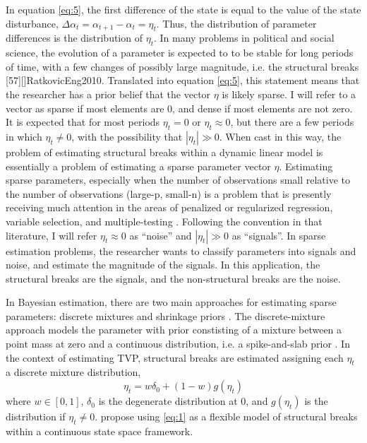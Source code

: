 \documentclass{article}
\begin{document}
In equation \eqref{eq:5}, the first difference of the state is equal to the value of the state disturbance, $\Delta \alpha_{t} = \alpha_{t+1} - \alpha_{t} = \eta_{t}$.
Thus, the distribution of parameter differences is the distribution of $\eta_{t}$.
In many problems in political and social science, the evolution of a parameter is expected to to be stable for long periods of time, with a few changes of possibly large magnitude, i.e. the structural breaks \parencite{Pierson2004}[57][]{RatkovicEng2010}.
Translated into equation \eqref{eq:5}, this statement means that the researcher has a prior belief that the vector $\eta$ is likely sparse.
I will refer to a vector as sparse if most elements are 0, and dense if most elements are not zero.
It is expected that for most periods $\eta_{t} = 0$ or $\eta_{t} \approx 0$, but there are a few periods in which $\eta_{t} \neq 0$, with the possibility that $|\eta_{t}| \gg 0$.
When cast in this way, the problem of estimating structural breaks within a dynamic linear model is essentially a problem of estimating a sparse parameter vector $\eta$.
Estimating sparse parameters, especially when the number of observations small relative to the number of observations (large-p, small-n) is a problem that is presently receiving much attention in the areas of penalized or regularized regression, variable selection, and multiple-testing \parencite{CarvalhoPolsonScott2010}.
Following the convention in that literature, I will refer $\eta_{t} \approx 0$ as ``noise'' and $|\eta_{t}| \gg 0$ as ``signals''.
In sparse estimation problems, the researcher wants to classify parameters into signals and noise, and estimate the magnitude of the signals.
In this application, the structural breaks are the signals, and the non-structural breaks are the noise.

In Bayesian estimation, there are two main approaches for estimating sparse parameters: discrete mixtures and shrinkage priors \parencite[73]{CarvalhoPolsonScott2009}.
The discrete-mixture approach models the parameter with prior constisting of a mixture between a point mass at zero and a continuous distribution, i.e. a spike-and-slab prior \parencite{GeorgeMcCulloch1993}.
In the context of estimating TVP, structural breaks are estimated assigning each $\eta_{t}$ a discrete mixture distribution,
\begin{equation}
  \label{eq:1}
  \eta_{t} = w \delta_{0} +  (1 - w) g(\eta_{t})
\end{equation}
where $w \in [0, 1]$, $\delta_{0}$ is the degenerate distribution at 0, and $g(\eta_{t})$ is the distribution if $\eta_{t} \neq 0$.
\textcite{GiordaniKohn2008} propose using \eqref{eq:1} as a flexible model of structural breaks within a continuous state space framework.
\end{document}
